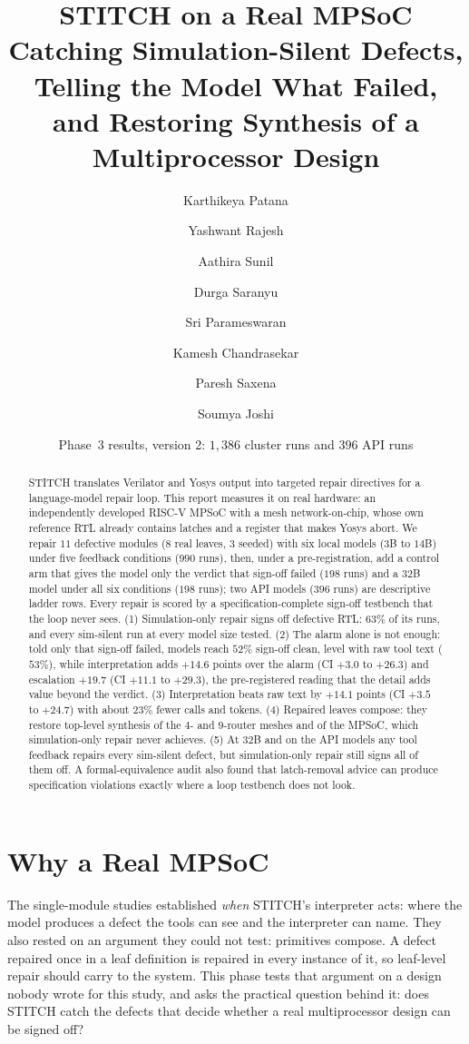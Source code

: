 \documentclass[11pt]{article}
\title{\textbf{STITCH on a Real MPSoC}\\[4pt]
\large\textnormal{Catching Simulation-Silent Defects, Telling the Model What
Failed, and Restoring Synthesis of a Multiprocessor Design}}
\author{Karthikeya Patana \and Yashwant Rajesh \and Aathira Sunil \and Durga Saranyu \and Sri Parameswaran \and Kamesh Chandrasekar \and Paresh Saxena \and Soumya Joshi}
\date{Phase~3 results, version 2: $1{,}386$ cluster runs and $396$ API runs}
\begin{document}
\maketitle

\begin{abstract}
STITCH translates Verilator and Yosys output into targeted repair directives
for a language-model repair loop. This report measures it on real hardware: an
independently developed RISC-V MPSoC with a mesh network-on-chip, whose own
reference RTL already contains latches and a register that makes Yosys abort.
We repair $11$ defective modules ($8$ real leaves, $3$ seeded) with six local
models ($3$B to $14$B) under five feedback conditions ($990$ runs), then, under
a pre-registration, add a control arm that gives the model only the verdict
that sign-off failed ($198$ runs) and a $32$B model under all six conditions
($198$ runs); two API models ($396$ runs) are descriptive ladder rows. Every
repair is scored by a specification-complete sign-off testbench that the loop
never sees. (1) Simulation-only repair signs off defective RTL: $63\%$ of its
runs, and every sim-silent run at every model size tested. (2) The alarm alone
is not enough: told only that sign-off failed, models reach $52\%$ sign-off
clean, level with raw tool text ($53\%$), while interpretation adds $+14.6$
points over the alarm (CI $+3.0$ to $+26.3$) and escalation $+19.7$ (CI $+11.1$
to $+29.3$), the pre-registered reading that the detail adds value beyond the
verdict. (3) Interpretation beats raw text by $+14.1$ points (CI $+3.5$ to
$+24.7$) with about $23\%$ fewer calls and tokens. (4) Repaired leaves compose:
they restore top-level synthesis of the $4$- and $9$-router meshes and of the
MPSoC, which simulation-only repair never achieves. (5) At $32$B and on the API
models any tool feedback repairs every sim-silent defect, but simulation-only
repair still signs all of them off. A formal-equivalence audit also found that
latch-removal advice can produce specification violations exactly where a loop
testbench does not look.
\end{abstract}

\section{Why a Real MPSoC}
\label{sec:why}

The single-module studies established \emph{when} STITCH's interpreter acts:
where the model produces a defect the tools can see and the interpreter can
name. They also rested on an argument they could not test: primitives compose.
A defect repaired once in a leaf definition is repaired in every instance of
it, so leaf-level repair should carry to the system. This phase tests that
argument on a design nobody wrote for this study, and asks the practical
question behind it: does STITCH catch the defects that decide whether a real
multiprocessor design can be signed off?
\end{document}
